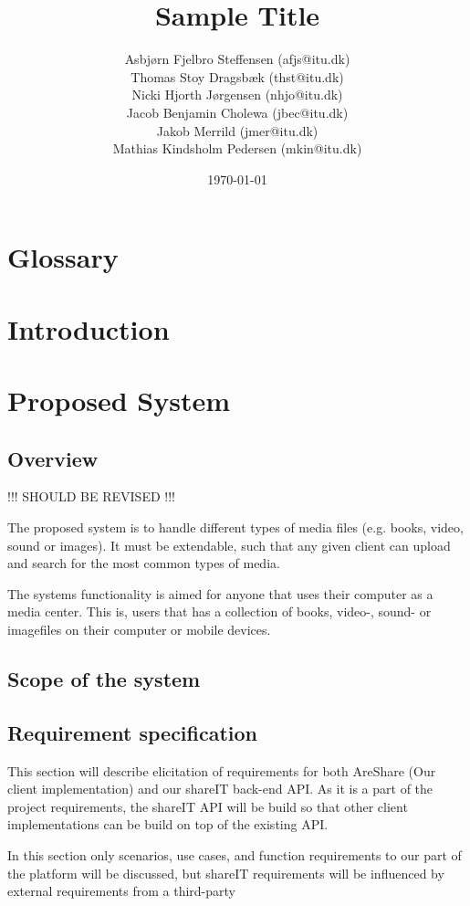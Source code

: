 \documentclass{report}
\title{Sample Title}
\date{\today}
\author{Asbj\o rn Fjelbro Steffensen (afjs@itu.dk)\\ Thomas Stoy Dragsb\ae k (thst@itu.dk)\\ Nicki Hjorth J\o rgensen (nhjo@itu.dk)\\ Jacob Benjamin Cholewa (jbec@itu.dk)\\ Jakob Merrild (jmer@itu.dk)\\ Mathias Kindsholm Pedersen (mkin@itu.dk)}
\begin{document}

\listoftodos[TODO]

\newpage
\tableofcontents

\chapter{Glossary}


\chapter{Introduction}


\newpage


\chapter{Proposed System}

\section{Overview}

!!! SHOULD BE REVISED !!!

The proposed system is to handle different types of media files (e.g. books, video, sound or images). It must be extendable, such that any given client can upload and search for the most common types of media.

The systems functionality is aimed for anyone that uses their computer as a media center. This is, users that has a collection of books, video-, sound- or imagefiles on their computer or mobile devices.

\section{Scope of the system}


\section{Requirement specification}

This section will describe elicitation of requirements for both AreShare (Our client implementation) and our shareIT back-end API. As it is a part of the project requirements, the shareIT API will be build so that other client implementations can be build on top of the existing API.

In this section only scenarios, use cases, and function requirements to our part of the platform will be discussed, but shareIT requirements will be influenced by external requirements from a third-party 
\end{document}
